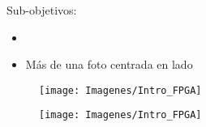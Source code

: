 \documentclass[a4,landscpae]{seminar}
\begin{document}





\begin{hslide}

Sub-objetivos:
	\begin{itemize}
		\item 
	\end{itemize}
\end{hslide}


\begin{hslide}

\end{hslide}




\begin{hslide}
\slsubsect{}
\begin{minipage}{5cm}
	\begin{itemize}
		\item M\'as de una foto centrada en lado
	\end{itemize}
\end{minipage} \hfill
\begin{minipage}{2cm}
	\begin{center}
		\begin{figure}
			\texttt{[image: Imagenes/Intro\_FPGA]}
		\end{figure}
	\end{center}
\end{minipage} \hfill
\begin{minipage}{2cm}
	\begin{center}
		\begin{figure}
			\texttt{[image: Imagenes/Intro\_FPGA]}
		\end{figure}
	\end{center}
\end{minipage}
\end{hslide}
\end{document}
